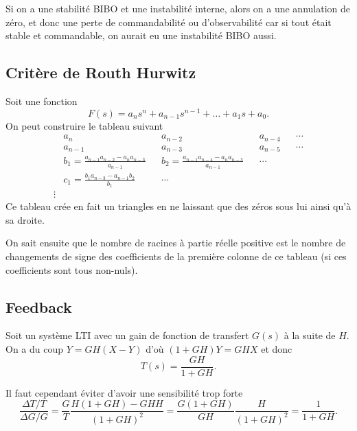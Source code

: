 Si on a une stabilité BIBO et une instabilité interne,
alors on a une annulation de zéro,
et donc une perte de commandabilité ou d'observabilité
car si tout était stable et commandable,
on aurait eu une instabilité BIBO aussi.

%

\subsection{Critère de Routh Hurwitz}
Soit une fonction
\[ F(s) = a_ns^n + a_{n-1}s^{n-1} + \ldots + a_1s + a_0. \]
On peut construire le tableau suivant
\begin{align*}
  &a_n && a_{n-2} && a_{n-4} && \cdots\\
  &a_{n-1} && a_{n-3} && a_{n-5} && \cdots\\
  &b_1=\frac{a_{n-1}a_{n-2}-a_na_{n-3}}{a_{n-1}} &&
  b_2=\frac{a_{n-1}a_{n-4}-a_na_{n-5}}{a_{n-1}} && \cdots\\
  &c_1=\frac{b_1a_{n-3}-a_{n-1}b_{2}}{b_1} && \cdots\\
  \vdots
\end{align*}
Ce tableau crée en fait un triangles en ne laissant que des zéros
sous lui ainsi qu'à sa droite.

On sait ensuite que le nombre de racines à partie réelle positive
est le nombre de changements de signe des coefficients de la première
colonne de ce tableau (si ces coefficients sont tous non-nuls).

\subsection{Feedback}
Soit un système LTI avec un gain de fonction de transfert $G(s)$ à la suite
de $H$.
On a du coup $Y = GH(X - Y)$ d'où $(1+GH)Y = GHX$ et donc
\[ T(s) = \frac{GH}{1+GH}. \]

Il faut cependant éviter d'avoir une sensibilité trop forte
\[ \frac{\Delta T/T}{\Delta G/G} =
\frac{G}{T}\frac{H(1 + GH) - GHH}{(1+GH)^2}
= \frac{G(1+GH)}{GH}\frac{H}{(1+GH)^2}
= \frac{1}{1+GH}. \]

